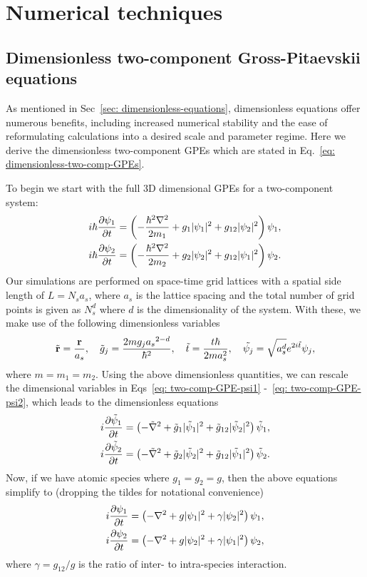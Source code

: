 \chapter{Numerical techniques}

\section{\label{sec: two-comp-dimensionless}Dimensionless two-component
Gross-Pitaevskii equations}

As mentioned in Sec~\ref{sec: dimensionless-equations}, dimensionless equations
offer numerous benefits, including increased numerical stability and the ease
of reformulating calculations into a desired scale and parameter regime.
Here we derive the dimensionless two-component GPEs which are stated in
Eq.~\eqref{eq: dimensionless-two-comp-GPEs}.

To begin we start with the full 3D dimensional GPEs for a two-component system:
\begin{align} \label{eq: two-comp-GPE-psi1}
    i\hbar\pdv{\psi_1}{t} &= \left(-\frac{\hbar^2\nabla^2}{2m_1} + g_1|\psi_1|^2
    +g_{12}|\psi_2|^2\right)\psi_1, \\
    i\hbar\pdv{\psi_2}{t} &= \left(-\frac{\hbar^2\nabla^2}{2m_2} + g_2|\psi_2|^2
    +g_{12}|\psi_1|^2\right)\psi_2. \label{eq: two-comp-GPE-psi2}
\end{align}
Our simulations are performed on space-time grid lattices with a spatial side
length of \(L = N_s a_s\), where \(a_s\) is the lattice spacing and the total
number of grid points is given as \(N_s^d\) where \(d\) is the dimensionality of
the system.
With these, we make use of the following dimensionless variables
\begin{align}
    \tilde{\vb{r}} = \frac{\vb{r}}{a_s}, \quad
    \tilde{g}_j = \frac{2mg_j{a_s}^{2-d}}{\hbar^2}, \quad
    \tilde{t} = \frac{t\hbar}{2ma_s^2}, \quad
    \tilde{\psi_j} = \sqrt{a_s^d}e^{2i\tilde{t}}\psi_j,
\end{align}
where \(m = m_1 = m_2\).
Using the above dimensionless quantities, we can rescale the dimensional
variables in Eqs~\eqref{eq: two-comp-GPE-psi1} -~\eqref{eq: two-comp-GPE-psi2},
which leads to the dimensionless equations
\begin{align}
    i\pdv{\tilde{\psi}_1}{t} &= \left(-\tilde{\nabla}^2
    + \tilde{g}_1|\tilde{\psi}_1|^2 + \tilde{g}_{12}|\tilde{\psi}_2|^2\right)
    \tilde{\psi}_1, \\
    i\pdv{\tilde{\psi}_2}{t} &= \left(-\tilde{\nabla}^2
    + \tilde{g}_2|\tilde{\psi}_2|^2 + \tilde{g}_{12}|\tilde{\psi}_1|^2\right)
    \tilde{\psi}_2.
\end{align}
Now, if we have atomic species where \(g_1=g_2=g\), then the above equations
simplify to (dropping the tildes for notational convenience)
\begin{align}
    i\pdv{{\psi}_1}{t} &= \left(-{\nabla}^2
    + {g}|{\psi}_1|^2 + {\gamma}|{\psi}_2|^2\right)
    {\psi}_1, \\
    i\pdv{{\psi}_2}{t} &= \left(-{\nabla}^2
    + {g}|{\psi}_2|^2 + \gamma|{\psi}_1|^2\right)
    {\psi}_2,
\end{align}
where \(\gamma = g_{12}/g\) is the ratio of inter- to intra-species interaction.
